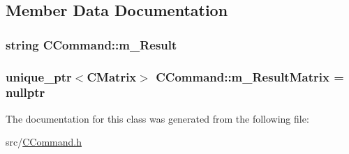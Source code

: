 \subsection{Member Data Documentation}
\subsubsection[{\texorpdfstring{m\+\_\+\+Result}{m_Result}}]{\setlength{\rightskip}{0pt plus 5cm}string C\+Command\+::m\+\_\+\+Result}\hypertarget{classCCommand_a95d58d40a428b703b727d8f847e6de1e}{}\label{classCCommand_a95d58d40a428b703b727d8f847e6de1e}
\subsubsection[{\texorpdfstring{m\+\_\+\+Result\+Matrix}{m_ResultMatrix}}]{\setlength{\rightskip}{0pt plus 5cm}unique\+\_\+ptr$<${\bf C\+Matrix}$>$ C\+Command\+::m\+\_\+\+Result\+Matrix = nullptr}\hypertarget{classCCommand_a5192105298cdb9ea3ef5c3d3aaeba50e}{}\label{classCCommand_a5192105298cdb9ea3ef5c3d3aaeba50e}


The documentation for this class was generated from the following file\+:\begin{DoxyCompactItemize}
\item 
src/\hyperlink{CCommand_8h}{C\+Command.\+h}\end{DoxyCompactItemize}
